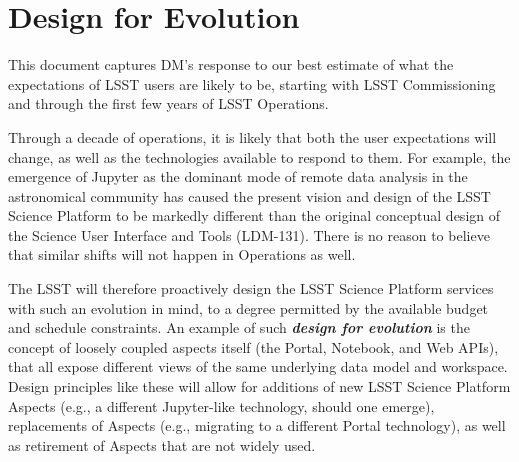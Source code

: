 \section{Design for Evolution\label{sec:evolution}}

This document captures DM's response to our best estimate of what the expectations of LSST users are likely to be, starting with LSST Commissioning and through the first few years of LSST Operations.

Through a decade of operations, it is likely that both the user expectations will change, as well as the technologies available to respond to them.
For example, the emergence of Jupyter as the dominant mode of remote data analysis in the astronomical community has caused the present vision and design of the LSST Science Platform to be markedly different than the original conceptual design of the Science User Interface and Tools (LDM-131).
There is no reason to believe that similar shifts will not happen in Operations as well.

The LSST will therefore proactively design the LSST Science Platform services with such an evolution in mind, to a degree permitted by the available budget and schedule constraints.
An example of such \textbf\emph{design for evolution} is the concept of loosely coupled aspects itself (the Portal, Notebook, and Web APIs), that all expose different views of the same underlying data model and workspace.
Design principles like these will allow for additions of new LSST Science Platform Aspects (e.g., a different Jupyter-like technology, should one emerge), replacements of Aspects (e.g., migrating to a different Portal technology), as well as retirement of Aspects that are not widely used.
